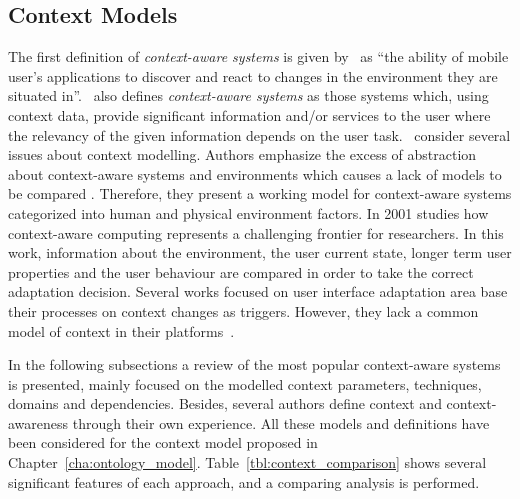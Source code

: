 \subsection{Context Models}
\label{sec:context_models}

The first definition of \textit{context-aware systems} is given by~\citet{schilit_disseminating_1994}
as ``the ability of mobile user's applications to discover and react to changes 
in the environment they are situated in''.~\citet{dey_understanding_2001} also 
defines \textit{context-aware systems} as those systems which, using context data, 
provide significant information and/or services to the user where the relevancy 
of the given information depends on the user task.~\citet{schmidt_there_1999} 
consider several issues about context modelling. Authors emphasize the excess of 
abstraction about context-aware systems and environments which causes a lack of 
models to be compared . Therefore, they present a working model for context-aware 
systems categorized into human and physical environment factors. In 2001
\citet{jameson_modelling_2001} studies how context-aware computing represents a 
challenging frontier for researchers. In this work, information about the 
environment, the user current state, longer term user properties and the user 
behaviour are compared in order to take the correct adaptation decision. Several 
works focused on user interface adaptation area base their processes on context 
changes as triggers. However, they lack a common model of context in their 
platforms~\citep{calvary_plasticity_2002}\citep{nilsson_model_based_2006}.

In the following subsections a review of the most popular context-aware systems
is presented, mainly focused on the modelled context parameters, techniques, 
domains and dependencies. Besides, several authors define context and 
context-awareness through their own experience. All these models and definitions 
have been considered for the context model proposed in 
Chapter~\ref{cha:ontology_model}. Table~\ref{tbl:context_comparison} shows 
several significant features of each approach, and a comparing analysis is 
performed.















